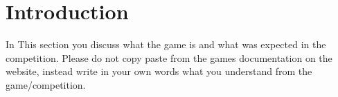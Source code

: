 \section{Introduction}



In This section you discuss what the game is and what was expected in the competition. Please do not copy paste from the games documentation on the website, instead write in your own words what you understand from the game/competition.
